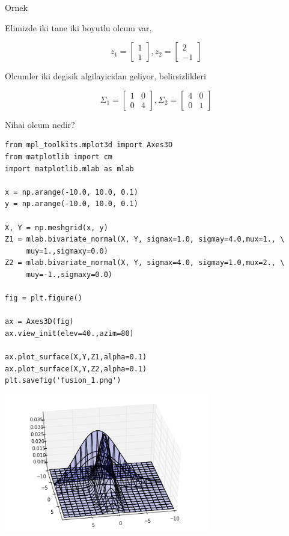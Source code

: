 \documentclass[12pt,fleqn]{article}\usepackage{../common}
\begin{document}
Ornek

Elimizde iki tane iki boyutlu olcum var, 

$$ z_1 = \left[\begin{array}{c}
1 \\ 1
\end{array}\right], 
z_2 = \left[\begin{array}{r}
2 \\ -1
\end{array}\right] 
$$

Olcumler iki degisik algilayicidan geliyor, belirsizlikleri

$$ 
\Sigma_1 = 
\left[\begin{array}{cc}
1 & 0 \\ 0 & 4
\end{array}\right], 
\Sigma_2 = 
\left[\begin{array}{cc}
4 & 0 \\ 0 & 1
\end{array}\right]
 $$

Nihai olcum nedir? 

\begin{verbatim}
from mpl_toolkits.mplot3d import Axes3D
from matplotlib import cm
import matplotlib.mlab as mlab

x = np.arange(-10.0, 10.0, 0.1)
y = np.arange(-10.0, 10.0, 0.1)

X, Y = np.meshgrid(x, y)
Z1 = mlab.bivariate_normal(X, Y, sigmax=1.0, sigmay=4.0,mux=1., \
     muy=1.,sigmaxy=0.0)
Z2 = mlab.bivariate_normal(X, Y, sigmax=4.0, sigmay=1.0,mux=2., \
     muy=-1.,sigmaxy=0.0)

fig = plt.figure()

ax = Axes3D(fig)
ax.view_init(elev=40.,azim=80)

ax.plot_surface(X,Y,Z1,alpha=0.1)
ax.plot_surface(X,Y,Z2,alpha=0.1)
plt.savefig('fusion_1.png')
\end{verbatim}


\includegraphics[height=6cm]{fusion_1.png}
\end{document}
